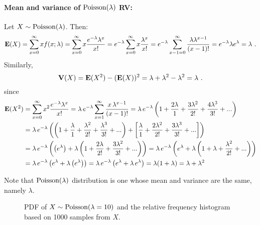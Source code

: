 \paragraph{Mean and variance of $\mbox{{\rm Poisson}}(\lambda)$ RV:}
Let $X \sim \mbox{{\rm Poisson}}(\lambda)$.  Then:
\[
\mathbf{E}(X) = \sum_{x=0}^{\infty} x f(x;\lambda)
= \sum_{x =0}^{\infty} x \frac{ e^{-\lambda} \lambda^x}{x!}
= e^{-\lambda} \sum_{x =0}^{\infty} x \frac{  \lambda^x}{x!}
= e^{-\lambda} \sum_{x -1 =0}^{\infty} \frac{ \lambda \lambda^{x-1}}{(x-1)!}
= e^{-\lambda} \lambda e^{\lambda}
= \lambda
\ .
\]
Similarly,
\[
\V(X) = \e(X^2)-(\e(X))^2 = \lambda + \lambda^2 - \lambda^2 = \lambda \ .
\]
since
\begin{align*}
\mathbf{E}(X^2)& = \sum_{x=0}^{\infty} x^2 \frac{e^{-\lambda} \lambda^x}{x!} = \lambda \, e^{-\lambda} \sum_{x=1}^{\infty} \frac{x \, \lambda^{x-1}}{(x-1)!}
= \lambda \, e^{-\lambda} \left( 1 + \frac{2 \lambda}{1} + \frac{3 \lambda^2}{2!} + \frac{4 \lambda^3}{3!} + ... \right)\\
&= \lambda \, e^{-\lambda} \left( \left( 1 + \frac{\lambda}{1} + \frac{\lambda^2}{2!} + \frac{\lambda^3}{3!} + ... \right) + \left[ \frac{\lambda}{1} + \frac{2 \lambda^2}{2!} + \frac{3 \lambda^3}{3!} + ... \right] \right)\\
&= \lambda \, e^{-\lambda} \left( \left( e^{\lambda} \right) + \lambda \left( 1 + \frac{2 \lambda}{2!} + \frac{3 \lambda^2}{3!} + ... \right) \right)
= \lambda \, e^{-\lambda} \left( e^{\lambda} + \lambda \left( 1 + \lambda + \frac{\lambda^2}{2!} + ... \right) \right)\\
&= \lambda \, e^{-\lambda} \left( e^{\lambda} + \lambda \left( e^{\lambda} \right) \right)
= \lambda \, e^{-\lambda} \left( e^{\lambda} + \lambda\, e^{\lambda}\right) = \lambda (1 + \lambda) = \lambda + \lambda^2
\end{align*}

Note that $\mbox{{\rm Poisson}}(\lambda)$ distribution is one whose mean and variance are the same, namely $\lambda$.

\begin{figure}[htpb]
\caption{PDF of $X \sim \mbox{{\rm Poisson}}(\lambda=10)$ and the relative frequency histogram based on 1000 samples from $X$.\label{F:PlotPdfSim1000HistPoiss10}}
\centering   {}
\end{figure}


